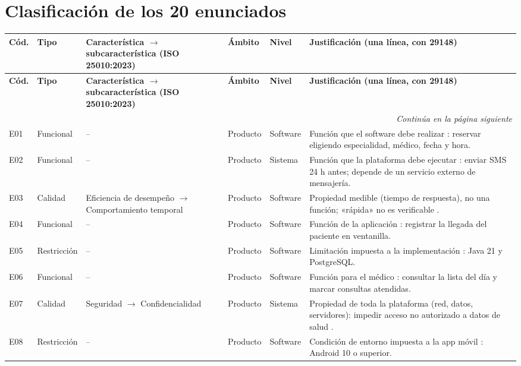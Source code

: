 \documentclass[11pt,a4paper]{article}
\newcommand{\cab}{\rowcolor{gray!18}}
\begin{document}
\section{Clasificación de los 20 enunciados}
\begingroup
\footnotesize
\setlength{\tabcolsep}{4pt}
\begin{longtable}{@{}p{0.95cm}p{1.75cm}p{3.1cm}p{1.45cm}p{1.35cm}p{7.6cm}@{}}
\toprule
\cab\textbf{Cód.} & \textbf{Tipo} & \textbf{Característica $\rightarrow$ subcaracterística (ISO 25010:2023)} & \textbf{Ámbito} & \textbf{Nivel} & \textbf{Justificación (una línea, con 29148)} \\
\midrule
\endfirsthead
\toprule
\cab\textbf{Cód.} & \textbf{Tipo} & \textbf{Característica $\rightarrow$ subcaracterística (ISO 25010:2023)} & \textbf{Ámbito} & \textbf{Nivel} & \textbf{Justificación (una línea, con 29148)} \\
\midrule
\endhead
\midrule
\multicolumn{6}{r}{\emph{Continúa en la página siguiente}}\\
\endfoot
\bottomrule
\endlastfoot
E01 & Funcional & -- & Producto & Software & Función que el software debe realizar \cite{iso29148}: reservar eligiendo especialidad, médico, fecha y hora.\\
E02 & Funcional & -- & Producto & Sistema & Función que la plataforma debe ejecutar \cite{iso29148}: enviar SMS 24 h antes; depende de un servicio externo de mensajería.\\
E03 & Calidad & Eficiencia de desempeño $\rightarrow$ Comportamiento temporal & Producto & Software & Propiedad medible (tiempo de respuesta), no una función; «rápida» no es verificable \cite{iso25010}.\\
E04 & Funcional & -- & Producto & Software & Función de la aplicación \cite{iso29148}: registrar la llegada del paciente en ventanilla.\\
E05 & Restricción & -- & Producto & Software & Limitación impuesta a la implementación \cite{iso29148}: Java 21 y PostgreSQL.\\
E06 & Funcional & -- & Producto & Software & Función para el médico \cite{iso29148}: consultar la lista del día y marcar consultas atendidas.\\
E07 & Calidad & Seguridad $\rightarrow$ Confidencialidad & Producto & Sistema & Propiedad de toda la plataforma (red, datos, servidores): impedir acceso no autorizado a datos de salud \cite{iso25010}.\\
E08 & Restricción & -- & Producto & Software & Condición de entorno impuesta a la app móvil \cite{iso29148}: Android 10 o superior.\\

\end{longtable}
\end{document}
